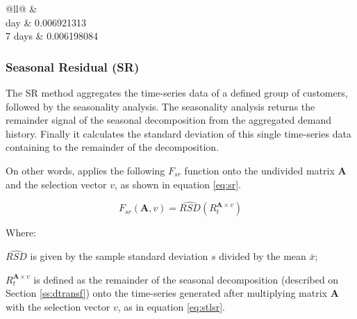 \documentclass[review, 3p, 12pt, authoryear]{elsarticle}
\begin{document}
\begin{table}[]
	\centering
	\caption{Results for different in-sample period oversaw by FV optimisation}
	\label{tb_fvperselec}
	\begin{tabular}{@{}ll@{}}
	\toprule
	 &  \\  day                                                                                                             & 0.006921313                               	\\
	7 days                                                                                                            & 0.006198084                               	\\ \bottomrule
	\end{tabular}
\end{table}

\subsubsection{Seasonal Residual (SR)}
\label{sss:SR}
The SR method aggregates the time-series data of a defined group of customers, followed by the seasonality analysis.
The seasonality analysis returns the remainder signal of the seasonal decomposition from the aggregated demand history.
Finally it calculates the standard deviation of this single time-series data containing to the remainder of the decomposition.

On other words, applies the following $F_{sr}$ function onto the undivided matrix $\bm{A}$ and the selection vector $v$, as shown in equation \ref{eq:sr}.

\begin{equation}
   F_{sr}(\bm{A},v) = \widehat{RSD}(R^{\bm{A} \times v}_t)
   \label{eq:sr}
\end{equation}

Where:

$\widehat{RSD}$ is given by the sample standard deviation $s$ divided by the mean $\bar{x}$;

$R^{\bm{A} \times v}_t$ is defined as the remainder of the seasonal decomposition (described on Section \ref{ss:dtransf}) onto the time-series generated after multiplying matrix $\bm{A}$ with the selection vector $v$, as in equation \ref{eq:stlsr}.
\end{document}
